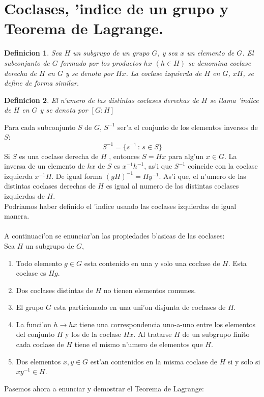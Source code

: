 \documentclass[a4paper,openright,12pt]{book}
\numberwithin{equation}{section} %
\newtheorem{definicion}{Definicion}[section] %
\begin{document}
\section{Coclases, 'indice de un grupo y Teorema de Lagrange.}
\begin{definicion}
Sea $H$ un subgrupo de un grupo $G$, y sea $x$ un elemento de $G$. El subconjunto de $G$ formado por los productos $hx$ $(h \in H)$ se denomina coclase derecha de $H$ en $G$ y se denota por $Hx$. La coclase izquierda de $H$ en $G$, $xH$, se define de forma similar. 
\end{definicion}
\begin{definicion}
El n'umero de las distintas coclases derechas de $H$ se llama 'indice de $H$ en $G$ y se denota por $[ G:H ]$
\end{definicion}
Para cada subconjunto $S$ de $G$, $S^{-1}$ ser'a el conjunto de los elementos inversos de $S$:
\[
S^{-1}= \{ s^{-1}\,:\, s \in S \}
\]
Si $S$ es una coclase derecha de $H$ , entonces $S=Hx$ para alg'un $x \in G$. La inversa de un elemento de $hx$ de $S$ es $x^{-1}h^{-1}$, as'i que $S^{-1}$  coincide con la coclase izquierda $x^{-1}H$. De igual forma $(yH)^{-1} = Hy^{-1}$. As'i que, el n'umero de las distintas coclases derechas de $H$ es igual al numero de las distintas coclases izquierdas de $H$.\\
Podriamos haber definido el 'indice usando las coclases izquierdas de igual manera.\\
\\
A continuaci'on se enunciar'an las propiedades b'asicas de las coclases:
\\
Sea $H$ un subgrupo de $G$,
\begin{enumerate}
\item Todo elemento $g \in G$ esta contenido en una y solo una coclase de $H$. Esta coclase es $Hg$.
\item Dos coclases distintas de $H$ no tienen elementos comunes.
\item El grupo $G$ esta particionado en una uni'on disjunta de coclases de $H$.
\item La funci'on $h \rightarrow hx$ tiene una correspondencia uno-a-uno entre los elementos del conjunto $H$ y los de la coclase $Hx$. Al tratarse $H$ de un subgrupo finito cada coclase de $H$ tiene el mismo n'umero de elementos que $H$.
\item Dos elementos $x,y \in G$ est'an contenidos en la misma coclase de $H$ si y solo si $xy^{-1}\in H$. 
\end{enumerate}
Pasemos ahora a enunciar y demostrar el Teorema de Lagrange:
\end{document}
